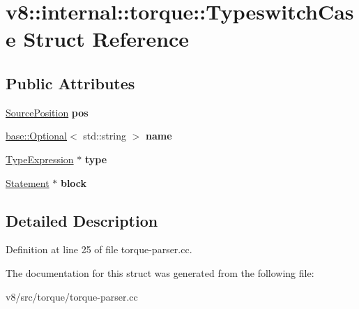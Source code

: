 \hypertarget{structv8_1_1internal_1_1torque_1_1TypeswitchCase}{}\section{v8\+:\+:internal\+:\+:torque\+:\+:Typeswitch\+Case Struct Reference}
\label{structv8_1_1internal_1_1torque_1_1TypeswitchCase}
\subsection*{Public Attributes}
\begin{DoxyCompactItemize}
\item 
\mbox{\label{structv8_1_1internal_1_1torque_1_1TypeswitchCase_aa03bcc3d198339677a6895611e30e857}} 
\mbox{\hyperlink{structv8_1_1internal_1_1torque_1_1SourcePosition}{Source\+Position}} {\bfseries pos}
\item 
\mbox{\label{structv8_1_1internal_1_1torque_1_1TypeswitchCase_ac0f467fdf89d72915547bf3f966db010}} 
\mbox{\hyperlink{classv8_1_1base_1_1Optional}{base\+::\+Optional}}$<$ std\+::string $>$ {\bfseries name}
\item 
\mbox{\label{structv8_1_1internal_1_1torque_1_1TypeswitchCase_a595db1b79484cd1740210e1bce80153e}} 
\mbox{\hyperlink{structv8_1_1internal_1_1torque_1_1TypeExpression}{Type\+Expression}} $\ast$ {\bfseries type}
\item 
\mbox{\label{structv8_1_1internal_1_1torque_1_1TypeswitchCase_abe991e57e645280440944b6ae233c58c}} 
\mbox{\hyperlink{structv8_1_1internal_1_1torque_1_1Statement}{Statement}} $\ast$ {\bfseries block}
\end{DoxyCompactItemize}


\subsection{Detailed Description}


Definition at line 25 of file torque-\/parser.\+cc.



The documentation for this struct was generated from the following file\+:\begin{DoxyCompactItemize}
\item 
v8/src/torque/torque-\/parser.\+cc\end{DoxyCompactItemize}
